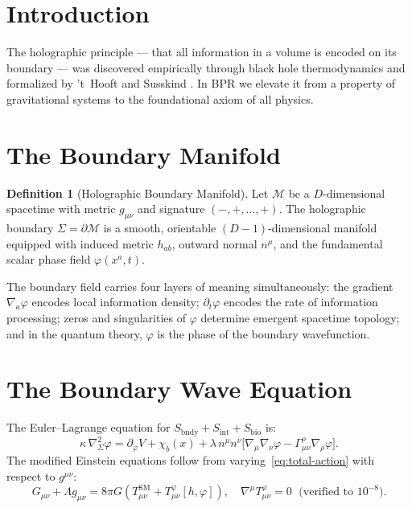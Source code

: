 \documentclass[12pt,oneside]{book}
\theoremstyle{definition}
\newtheorem{definition}{Definition}[chapter]
\begin{document}
\section{Introduction}

The holographic principle --- that all information in a volume is encoded on its
boundary --- was discovered empirically through black hole thermodynamics
\citep{Bekenstein1973,Hawking1975} and formalized by 't~Hooft \citep{tHooft1993}
and Susskind \citep{Susskind1995}. In BPR we elevate it from a property of
gravitational systems to the foundational axiom of all physics.

\section{The Boundary Manifold}

\begin{definition}[Holographic Boundary Manifold]
  \label{def:boundary-manifold}
  Let $\mathcal{M}$ be a $D$-dimensional spacetime with metric $g_{\mu\nu}$ and
  signature $(-,+,\ldots,+)$. The holographic boundary $\Sigma = \partial\mathcal{M}$
  is a smooth, orientable $(D{-}1)$-dimensional manifold equipped with induced
  metric $h_{ab}$, outward normal $n^\mu$, and the fundamental scalar phase field
  $\varphi(x^a, t)$.
\end{definition}

The boundary field carries four layers of meaning simultaneously:
the gradient $\nabla_a\varphi$ encodes local information density;
$\partial_t\varphi$ encodes the rate of information processing;
zeros and singularities of $\varphi$ determine emergent spacetime topology;
and in the quantum theory, $\varphi$ is the phase of the boundary wavefunction.

\section{The Boundary Wave Equation}

The Euler--Lagrange equation for $S_{\mathrm{bndy}} + S_{\mathrm{int}} +
S_{\mathrm{bio}}$ is:
\begin{equation}
  \label{eq:boundary-wave}
  \kappa\,\nabla^2_\Sigma\varphi
  = \partial_\varphi V
    + \chi_b(x)
    + \lambda\,n^\mu n^\nu\bigl[\nabla_\mu\nabla_\nu\varphi
      - \Gamma^\rho_{\mu\nu}\nabla_\rho\varphi\bigr].
\end{equation}
The modified Einstein equations follow from varying~\eqref{eq:total-action} with
respect to $g^{\mu\nu}$:
\begin{equation}
  \label{eq:einstein-modified}
  G_{\mu\nu} + \Lambda g_{\mu\nu}
  = 8\pi G\!\left(T^{\mathrm{SM}}_{\mu\nu} + T^\varphi_{\mu\nu}[h,\varphi]\right),
  \quad \nabla^\mu T^\varphi_{\mu\nu} = 0 \;\text{ (verified to }10^{-8}).
\end{equation}
\end{document}

